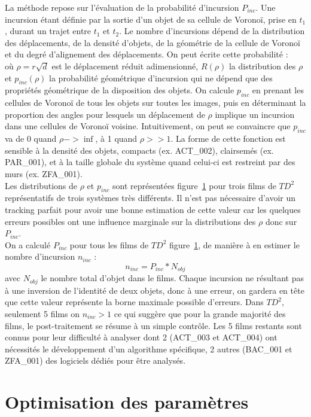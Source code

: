 	La méthode repose sur l'évaluation de la probabilité d'incursion $P_{inc}$. Une incursion étant définie par la sortie d'un objet de sa cellule de Voronoï, prise en $t_1$, durant un trajet entre $t_1$ et $t_2$. Le nombre d'incursions dépend de la distribution des déplacements, de la densité d'objets, de la géométrie de la cellule de Voronoï et du degré d'alignement des déplacements. On peut écrite cette probabilité :
	$$$$
	où $\rho=r\sqrt{d}$ est le déplacement réduit adimensionné, $R(\rho)$ la distribution des $\rho$ et $p_{inc}(\rho)$ la probabilité géométrique d’incursion qui ne dépend que des propriétés géométrique de la disposition des objets. On calcule $p_{inc}$ en prenant les cellules de Voronoï de tous les objets sur toutes les images, puis en déterminant la proportion des angles pour lesquels un déplacement de $\rho$ implique un incursion dans une cellules de Voronoï voisine. Intuitivement, on peut se convaincre que $p_{inc}$ va de 0 quand $\rho->\inf$, à 1 quand $\rho>>1$. La forme de cette fonction est sensible à la densité des objets, compacts (ex. ACT\_002), clairsemés (ex. PAR\_001), et à la taille globale du système quand celui-ci est restreint par des murs (ex. ZFA\_001).\\
	
	Les distributions de $\rho$ et $p_{inc}$ sont représentées figure~\ref{} pour trois films de $TD^2$ représentatifs de trois systèmes très différents. Il n'est pas nécessaire d'avoir un tracking parfait pour avoir une bonne estimation de cette valeur car les quelques erreurs possibles ont une influence marginale sur la distributions des $\rho$ donc sur $P_{inc}$.\\
	On a calculé $P_{inc}$ pour tous les films de $TD^2$ figure~\ref{}, de manière à en estimer le nombre d'incursion $n_{inc}$ :
	$$
	    n_{inc}=P_{inc}*N_{obj}
	$$
	avec $N_{obj}$ le nombre total d'objet dans le films.
	Chaque incursion ne résultant pas à une inversion de l'identité de deux objets, donc à une erreur, on gardera en tête que cette valeur représente la borne maximale possible d'erreurs. Dans $TD^2$, seulement 5 films on $n_{inc}>1$ ce qui suggère que pour la grande majorité des films, le post-traitement se résume à un simple contrôle. Les 5 films restants sont connus pour leur difficulté à analyser dont 2 (ACT\_003 et ACT\_004) ont nécessités le développement d'un algorithme spécifique, 2 autres (BAC\_001 et ZFA\_001) des logiciels dédiés pour être analysés.
	
	\section{Optimisation des paramètres}
	
